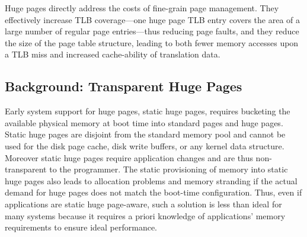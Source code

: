 Huge pages directly address the costs of fine-grain page management.
They effectively increase TLB coverage---one huge page TLB entry covers the area
of a large number of regular page entries---thus reducing page faults, and they
reduce the size of the page table structure, leading to both fewer memory
accesses upon a TLB miss and increased cache-ability of translation data.
%
%

\subsection{Background: Transparent Huge Pages} \label{sec:thp_bg}
Early system support for huge pages, static huge pages, requires bucketing the
available physical memory at boot time into standard pages and huge pages.
Static huge pages are disjoint from the standard memory pool and cannot be used
for the disk page cache, disk write buffers, or any kernel data structure.
Moreover static huge pages require application changes and are thus
non-transparent to the programmer. The static provisioning of memory into static
huge pages also leads to allocation problems and memory stranding if the actual
demand for huge pages does not match the boot-time configuration.  Thus, even if
applications are static huge page-aware, such a solution is less than ideal for
many systems because it requires a priori knowledge of applications' memory
requirements to ensure ideal performance.


